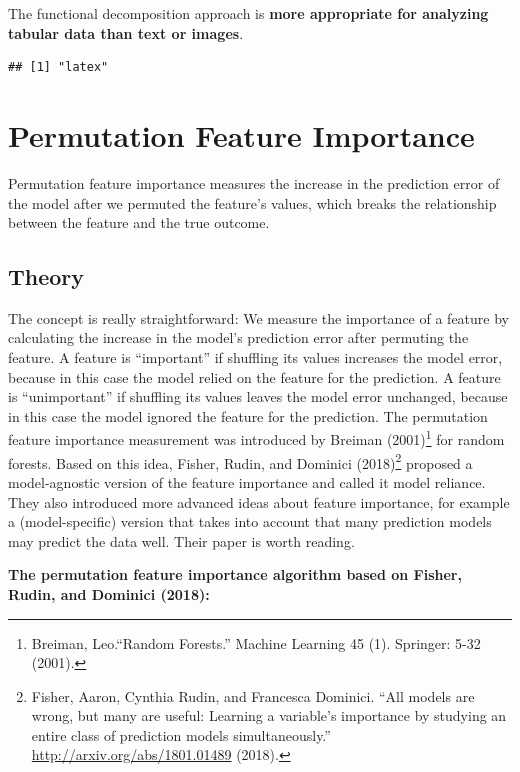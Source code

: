 \documentclass[
  11pt,
]{scrbook}
\begin{document}
The functional decomposition approach is \textbf{more appropriate for analyzing tabular data than text or images}.

\begin{verbatim}
## [1] "latex"
\end{verbatim}

\newpage

\hypertarget{feature-importance}{%
\section{Permutation Feature Importance}\label{feature-importance}}

Permutation feature importance measures the increase in the prediction error of the model after we permuted the feature's values, which breaks the relationship between the feature and the true outcome.

\hypertarget{theory-3}{%
\subsection{Theory}\label{theory-3}}

The concept is really straightforward:
We measure the importance of a feature by calculating the increase in the model's prediction error after permuting the feature.
A feature is ``important'' if shuffling its values increases the model error, because in this case the model relied on the feature for the prediction.
A feature is ``unimportant'' if shuffling its values leaves the model error unchanged, because in this case the model ignored the feature for the prediction.
The permutation feature importance measurement was introduced by Breiman (2001)\footnote{Breiman, Leo.``Random Forests.'' Machine Learning 45 (1). Springer: 5-32 (2001).} for random forests.
Based on this idea, Fisher, Rudin, and Dominici (2018)\footnote{Fisher, Aaron, Cynthia Rudin, and Francesca Dominici. ``All models are wrong, but many are useful: Learning a variable's importance by studying an entire class of prediction models simultaneously.'' \url{http://arxiv.org/abs/1801.01489} (2018).} proposed a model-agnostic version of the feature importance and called it model reliance.
They also introduced more advanced ideas about feature importance, for example a (model-specific) version that takes into account that many prediction models may predict the data well.
Their paper is worth reading.

\textbf{The permutation feature importance algorithm based on Fisher, Rudin, and Dominici (2018):}
\end{document}
